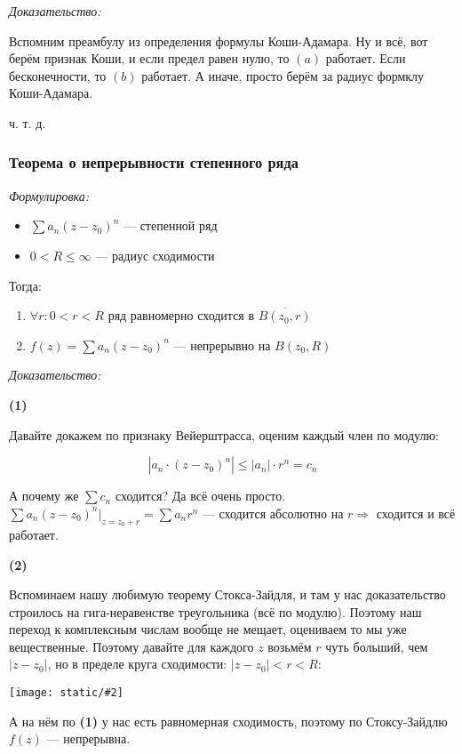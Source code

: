 \documentclass{article}
\def\images#1#2{\begin{center}\texttt{[image: static/\#2]}\end{center}}
\begin{document}
\textit{Доказательство:}

Вспомним преамбулу из определения формулы Коши-Адамара. Ну и всё, вот берём признак Коши, и если предел равен нулю, то $(a)$ работает. Если бесконечности, то $(b)$ работает. А иначе, просто берём за радиус формклу Коши-Адамара.

ч. т. д.


\subsubsection{Теорема о непрерывности степенного ряда}
\textit{Формулировка:}

\begin{itemize}
    \item $\sum a_n(z - z_0)^n$ --- степенной ряд
    \item $0 < R \le \infty$ --- радиус сходимости
\end{itemize}

Тогда:

\begin{enumerate}
    \item $\forall r:  0 < r < R$ ряд равномерно сходится в $\overline{B(z_0, r)}$
    \item $f(z) = \sum a_n (z - z_0)^n$ --- непрерывно на $B(z_0, R)$
\end{enumerate}

\textit{Доказательство:}

\textbf{(1)}

Давайте докажем по признаку Вейерштрасса, оценим каждый член по модулю:

\[\left|a_n \cdot (z - z_0)^n\right| \le |a_n| \cdot r^n = c_n\]

А почему же $\sum c_n$ сходится? Да всё очень просто. $\sum a_n (z - z_0)^n|_{z = z_0 + r} = \sum a_n r^n$ --- сходится абсолютно на $r \Rightarrow$ сходится и всё работает.

\textbf{(2)}

Вспоминаем нашу любимую теорему Стокса-Зайдля, и там у нас доказательство строилось на гига-неравенстве треугольника (всё по модулю). Поэтому наш переход к комплексным числам вообще не мещает, оцениваем то мы уже вещественные. Поэтому давайте для каждого $z$ возьмём $r$ чуть больший, чем $|z - z_0|$, но в пределе круга сходимости: $|z - z_0| < r < R$: 

\images{0.3}{st_r_nepr.png}

А на нём по \textbf{(1)} у нас есть равномерная сходимость, поэтому по Стоксу-Зайдлю $f(z)$ --- непрерывна.
\end{document}
